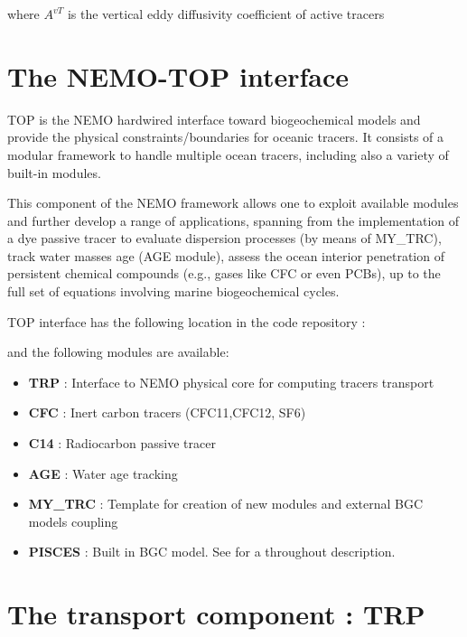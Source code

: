 \documentclass[../main/TOP_manual]{subfiles}
\begin{document}
where $A^{vT}$ is the vertical eddy diffusivity coefficient of active tracers

\section{The NEMO-TOP interface}
\label{sec:TopInt}

TOP is the NEMO hardwired interface toward biogeochemical models and provide the physical constraints/boundaries for oceanic tracers. It consists of a modular framework to handle multiple ocean tracers, including also a variety of built-in modules.

This component of the NEMO framework allows one to exploit available modules  and further develop a range of applications, spanning from the implementation of a dye passive tracer to evaluate dispersion processes (by means of MY\_TRC), track water masses age (AGE module), assess the ocean interior penetration of persistent chemical compounds (e.g., gases like CFC or even PCBs), up to the full set of equations involving marine biogeochemical cycles.

TOP interface has the following location in the code repository : 

and the following modules are available:

\begin{itemize}
        \item \textbf{TRP}    	    :    Interface to NEMO physical core for computing tracers transport
        \item \textbf{CFC}	    :    Inert carbon tracers (CFC11,CFC12, SF6)
        \item \textbf{C14}	    :    Radiocarbon passive tracer
        \item \textbf{AGE}	    :    Water age tracking
        \item \textbf{MY\_TRC}  :	Template for creation of new modules and external BGC models coupling
        \item \textbf{PISCES}    :	 Built in BGC model. See \citep{aumont_2015} for a throughout description.
\end{itemize}

\section{The transport component : TRP}
\end{document}
